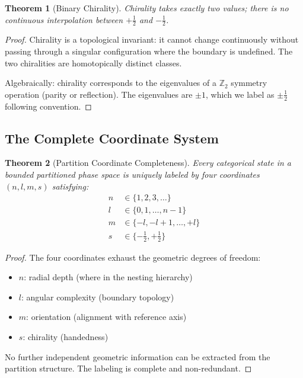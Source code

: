 \documentclass[twocolumn,10pt,a4paper]{article}
\newtheorem{theorem}{Theorem}[section]
\theoremstyle{definition}
\theoremstyle{remark}
\begin{document}
\begin{theorem}[Binary Chirality]
\label{thm:binary_chirality}
Chirality takes exactly two values; there is no continuous interpolation between $+\frac{1}{2}$ and $-\frac{1}{2}$.
\end{theorem}

\begin{proof}
Chirality is a topological invariant: it cannot change continuously without passing through a singular configuration where the boundary is undefined. The two chiralities are homotopically distinct classes.

Algebraically: chirality corresponds to the eigenvalues of a $\mathbb{Z}_2$ symmetry operation (parity or reflection). The eigenvalues are $\pm 1$, which we label as $\pm\frac{1}{2}$ following convention.
\end{proof}

\subsection{The Complete Coordinate System}

\begin{theorem}[Partition Coordinate Completeness]
\label{thm:completeness}
Every categorical state in a bounded partitioned phase space is uniquely labeled by four coordinates $(n, l, m, s)$ satisfying:
\begin{align}
    n &\in \{1, 2, 3, \ldots\} \\
    l &\in \{0, 1, \ldots, n-1\} \\
    m &\in \{-l, -l+1, \ldots, +l\} \\
    s &\in \{-\tfrac{1}{2}, +\tfrac{1}{2}\}
\end{align}
\end{theorem}

\begin{proof}
The four coordinates exhaust the geometric degrees of freedom:
\begin{itemize}
    \item $n$: radial depth (where in the nesting hierarchy)
    \item $l$: angular complexity (boundary topology)
    \item $m$: orientation (alignment with reference axis)
    \item $s$: chirality (handedness)
\end{itemize}
No further independent geometric information can be extracted from the partition structure. The labeling is complete and non-redundant.
\end{proof}
\end{document}
